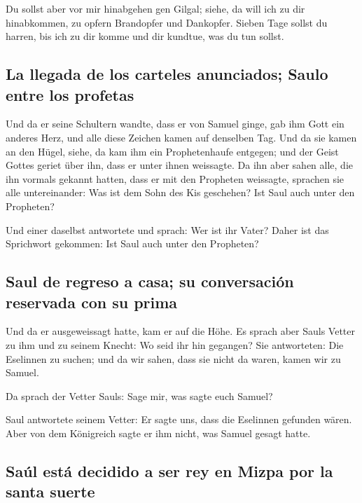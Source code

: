  Du sollst aber vor mir hinabgehen gen Gilgal; siehe, da
will ich zu dir hinabkommen, zu opfern Brandopfer und Dankopfer. Sieben
Tage sollst du harren, bis ich zu dir komme und dir kundtue, was du tun
sollst.

\hypertarget{la-llegada-de-los-carteles-anunciados-saulo-entre-los-profetas}{%
\subsection{La llegada de los carteles anunciados; Saulo entre los
profetas}\label{la-llegada-de-los-carteles-anunciados-saulo-entre-los-profetas}}

 Und da er seine Schultern wandte, dass er von Samuel
ginge, gab ihm Gott ein anderes Herz, und alle diese Zeichen kamen auf
denselben Tag.  Und da sie kamen an den Hügel, siehe, da
kam ihm ein Prophetenhaufe entgegen; und der Geist Gottes geriet über
ihn, dass er unter ihnen weissagte.  Da ihn aber sahen
alle, die ihn vormals gekannt hatten, dass er mit den Propheten
weissagte, sprachen sie alle untereinander: Was ist dem Sohn des Kis
geschehen? Ist Saul auch unter den Propheten?

 Und einer daselbst antwortete und sprach: Wer ist ihr
Vater? Daher ist das Sprichwort gekommen: Ist Saul auch unter den
Propheten?

\hypertarget{saul-de-regreso-a-casa-su-conversaciuxf3n-reservada-con-su-prima}{%
\subsection{Saul de regreso a casa; su conversación reservada con su
prima}\label{saul-de-regreso-a-casa-su-conversaciuxf3n-reservada-con-su-prima}}

 Und da er ausgeweissagt hatte, kam er auf die Höhe.
 Es sprach aber Sauls Vetter zu ihm und zu seinem Knecht:
Wo seid ihr hin gegangen? Sie antworteten: Die Eselinnen zu suchen; und
da wir sahen, dass sie nicht da waren, kamen wir zu Samuel.

 Da sprach der Vetter Sauls: Sage mir, was sagte euch
Samuel?

 Saul antwortete seinem Vetter: Er sagte uns, dass die
Eselinnen gefunden wären. Aber von dem Königreich sagte er ihm nicht,
was Samuel gesagt hatte.

\hypertarget{sauxfal-estuxe1-decidido-a-ser-rey-en-mizpa-por-la-santa-suerte}{%
\subsection{Saúl está decidido a ser rey en Mizpa por la santa
suerte}\label{sauxfal-estuxe1-decidido-a-ser-rey-en-mizpa-por-la-santa-suerte}}

